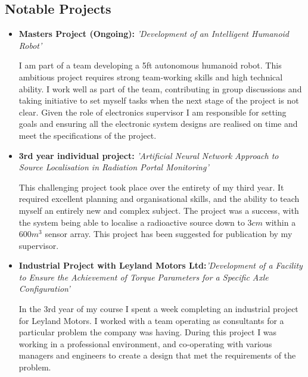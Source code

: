 \subsection{Notable Projects}
\vspace{5pt}
\begin{itemize}
    
    \item{\textbf{Masters Project (Ongoing):} \textit{'Development of an Intelligent Humanoid Robot'}
          
          \vspace{3pt}
          
          \small{I am part of a team developing a 5ft autonomous humanoid robot. This ambitious project requires strong team-working skills and high technical ability. I work well as part of the team, contributing in group discussions and taking initiative to set myself tasks when the next stage of the project is not clear. Given the role of electronics supervisor I am responsible for setting goals and ensuring all the electronic system designs are realised on time and meet the specifications of the project.}}
    
    \newpage
    
    \item{\textbf{3rd year individual project:} \textit{'Artificial Neural Network Approach to Source Localisation in Radiation Portal Monitoring'}
          
          \vspace{3pt}
          
          \small{This challenging project took place over the entirety of my third year. It required excellent planning and organisational skills, and the ability to teach myself an entirely new and complex subject. The project was a success, with the system being able to localise a radioactive source down to $ 3 cm$ within a $ 600 m^3$ sensor array. This project has been suggested for publication by my supervisor.}}
    
    \vspace{6pt}
    
    \item{\textbf{Industrial Project with Leyland Motors Ltd:}\textit{'Development of a Facility to Ensure the Achievement of Torque Parameters for a Specific Axle Configuration'}
          
          \vspace{3pt}
          
          \small{In the 3rd year of my course I spent a week completing an industrial project for Leyland Motors. I worked with a team operating as consultants for a particular problem the company was having. During this project I was working in a professional environment, and co-operating with various managers and engineers to create a design that met the requirements of the problem.}}
    
\end{itemize}